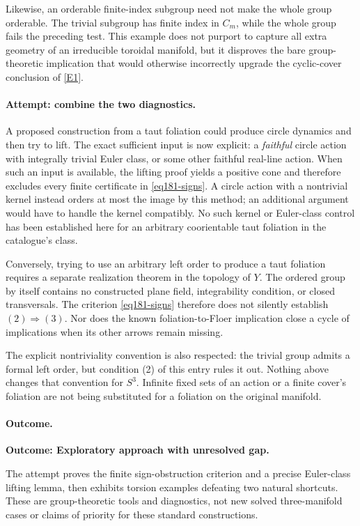 \documentclass[11pt,a4paper]{article}
\newcommand{\eref}[2]{\hyperlink{extra:#1:#2}{[E#2]}}
\numberwithin{equation}{section}
\begin{document}
Likewise, an orderable finite-index subgroup need not make the whole group
orderable. The trivial subgroup has finite index in $C_m$, while the whole
group fails the preceding test. This example does not purport to capture
all extra geometry of an irreducible toroidal manifold, but it disproves
the bare group-theoretic implication that would otherwise incorrectly
upgrade the cyclic-cover conclusion of \eref{statement}{1}.

\paragraph{Attempt: combine the two diagnostics.}
A proposed construction from a taut foliation could produce circle dynamics
and then try to lift. The exact sufficient input is now explicit: a
\emph{faithful} circle action with integrally trivial Euler class, or some
other faithful real-line action. When such an input is available, the
lifting proof yields a positive cone and therefore excludes every finite
certificate in \eqref{eq181-signs}. A circle action with a nontrivial kernel
instead orders at most the image by this method; an additional argument
would have to handle the kernel compatibly. No such kernel or Euler-class
control has been established here for an arbitrary coorientable taut
foliation in the catalogue's class.

Conversely, trying to use an arbitrary left order to produce a taut
foliation requires a separate realization theorem in the topology of $Y$.
The ordered group by itself contains no constructed plane field,
integrability condition, or closed transversals. The criterion
\eqref{eq181-signs} therefore does not silently establish
$(2)\Rightarrow(3)$. Nor does the known foliation-to-Floer implication
close a cycle of implications when its other arrows remain missing.

The explicit nontriviality convention is also respected: the trivial group
admits a formal left order, but condition (2) of this entry rules it out.
Nothing above changes that convention for $S^3$. Infinite fixed sets of
an action or a finite cover's foliation are not being substituted for a
foliation on the original manifold.

\paragraph{Outcome.}
\textbf{Outcome: Exploratory approach with unresolved gap.}

The attempt proves the finite sign-obstruction criterion and a precise
Euler-class lifting lemma, then exhibits torsion examples defeating two
natural shortcuts. These are group-theoretic tools and diagnostics, not
new solved three-manifold cases or claims of priority for these standard
constructions.
\end{document}
